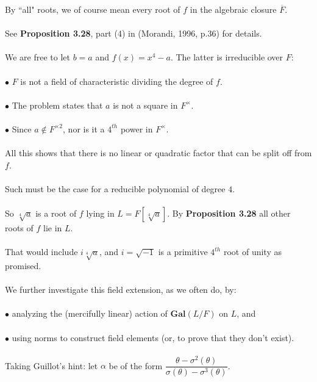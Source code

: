 \documentclass{article}
\begin{document}
\indent \indent By ``all" roots, we of course mean every root of $f$ in the algebraic closure $\overline{F}$. \\\\
\indent \indent See \textbf{Proposition 3.28}, part (4) in (Morandi, 1996, p.36) for details. \\\\
\indent We are free to let $b = a$ and $f(x) = x^4 - a$. The latter is irreducible over $F$: \\\\ 
\indent \indent $\bullet$ \indent $F$ is not a field of characteristic dividing the degree of $f$. \\\\
\indent \indent $\bullet$ \indent The problem states that $a$ is not a square in $F^{\times}$. \\\\
\indent \indent $\bullet$ \indent Since $a \notin F^{\times2}$, nor is it a $4^{th}$ power in $F^{\times}$.\\\\ 
\indent \indent All this shows that there is no linear or quadratic factor that can be split off from $f$.\\\\
\indent \indent Such must be the case for a reducible polynomial of degree $4$. \\\\
\indent So $\sqrt[4]{a}$ is a root of $f$ lying in $L = F[\sqrt[4]{a}]$. By \textbf{Proposition 3.28} all other roots of $f$ lie in $L$. \\\\
\indent That would include $i\sqrt[4]{a}$, and $i = \sqrt{-1}$ is a primitive $4^{th}$ root of unity as promised. \\\\
We further investigate this field extension, as we often do, by: \\\\
\indent $\bullet$ \indent analyzing the (mercifully linear) action of $\textbf{Gal}(L/F)$ on $L$, and \\\\
\indent $\bullet$ \indent using norms to construct field elements (or, to prove that they don't exist). \\\\
Taking Guillot's hint: let $\alpha$ be of the form $\dfrac{\theta - \sigma^2(\theta)}{\sigma(\theta) - \sigma^3(\theta)}$. \\\\
\end{document}
